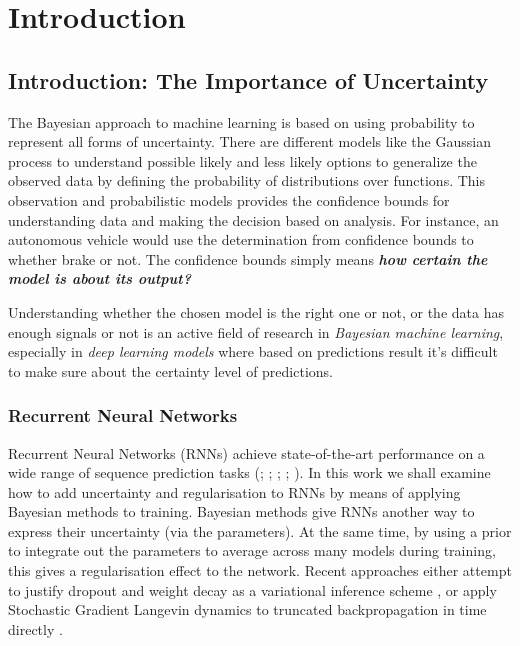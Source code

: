 \chapter{Introduction}
\label{chap:intro}

\section{Introduction: The Importance of Uncertainty}

The Bayesian approach to machine learning is based on using probability to represent all forms of uncertainty. There are different models like the Gaussian process to understand possible likely and less likely options to generalize the observed data by defining the probability of distributions over functions. This observation and probabilistic models provides the confidence bounds for understanding data and making the decision based on analysis. For instance, an autonomous vehicle would use the determination from confidence bounds to whether brake or not. The confidence bounds simply means \textbf{\textit{how certain the model is about its output?}}

Understanding whether the chosen model is the right one or not, or the data has enough signals or not is an active field of research \cite{Ghahramani2015} in \textit{Bayesian machine learning}, especially in \textit{deep learning models} where based on predictions result it's difficult to make sure about the certainty level of predictions.  

\subsection{Recurrent Neural Networks}

Recurrent Neural Networks (RNNs) achieve state-of-the-art performance on a wide range of sequence prediction tasks (\cite{Wu2016}; \cite{Amodei2015}; \cite{Jozefowicz2016}; \cite{Zaremba2014}; \cite{Lu2016}).
In this work we shall examine how to add uncertainty and regularisation to RNNs by means of applying Bayesian methods to training.
Bayesian methods give RNNs another way to express their uncertainty (via the parameters).
At the same time, by using a prior to integrate out the parameters to average across many models during training, this gives a regularisation effect to the network.
Recent approaches either attempt to justify dropout \cite{Srivastava2014} and weight decay as a variational inference scheme \cite{Gal2015}, or apply Stochastic Gradient Langevin dynamics \cite{Welling2011} to truncated backpropagation in time directly \cite{Gan2016}.

